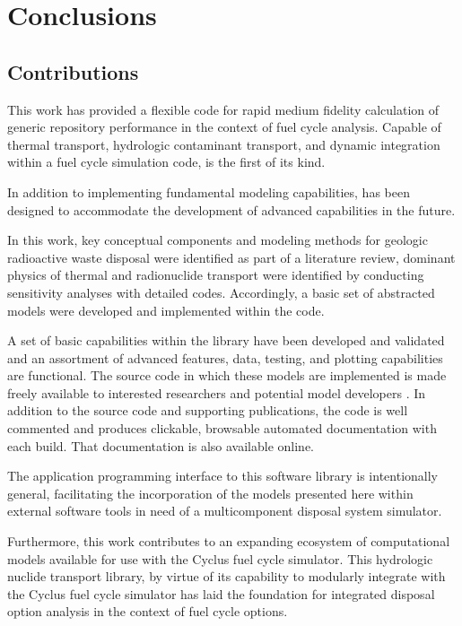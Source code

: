 \chapter{Conclusions}\label{ch:conclusion}
\section{Contributions}

This work has provided a flexible code for rapid medium fidelity calculation of 
generic repository performance in the context of fuel cycle analysis.  Capable 
of thermal transport, hydrologic contaminant transport, and dynamic integration 
within a fuel cycle simulation code, \Cyder is the first of its kind.  

In addition to implementing fundamental modeling capabilities, \Cyder has been 
designed to accommodate the development of advanced capabilities in the future.

In this work, key conceptual components and modeling methods for geologic 
radioactive waste disposal were identified as part of a literature review, 
dominant physics of thermal and radionuclide transport were identified by 
conducting sensitivity analyses with detailed codes. Accordingly, a basic set 
of abstracted models were developed and implemented within the \Cyder code. 

A set of basic capabilities within the \Cyder library have been developed and 
validated and an assortment of advanced features, data, testing, and plotting 
capabilities are functional.  The \Cyder source code in which these models are 
implemented  is made freely available to interested researchers and potential 
model developers \cite{huff_cyder_2013}. In addition to the source code and 
supporting publications, the \Cyder code is well commented and produces 
clickable, browsable automated documentation with each build. That 
documentation is also available online.

The application programming interface to this software library is intentionally 
general, facilitating the incorporation of the models presented here within 
external software tools in need of a multicomponent disposal system simulator. 

Furthermore, this work contributes to an expanding ecosystem of computational 
models available for use with the Cyclus fuel cycle simulator. This hydrologic 
nuclide transport library, by virtue of its capability to modularly integrate 
with the Cyclus fuel cycle simulator has laid the foundation for integrated 
disposal option analysis in the context of fuel cycle options. 

